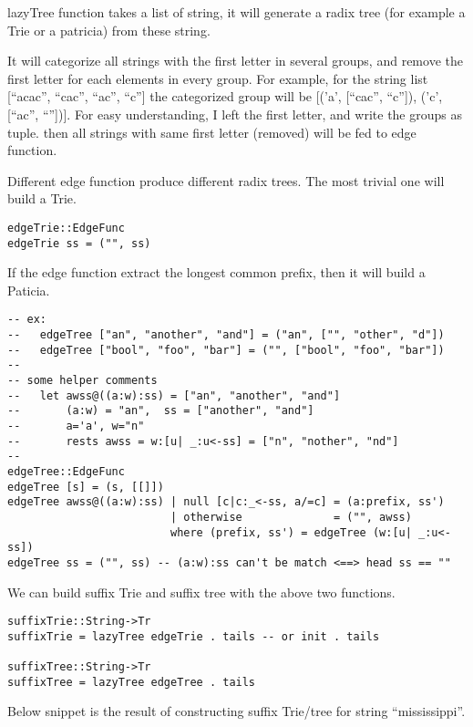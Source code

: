 \documentclass{article}
\begin{document}
lazyTree function takes a list of string, it will generate a radix
tree (for example a Trie or a patricia) from these string.

It will categorize all strings with the first letter in several groups, 
and remove the first letter for each elements in every group.
For example, for the string list [``acac'', ``cac'', ``ac'', ``c'']
the categorized group will be [('a', [``cac'', ``c'']), ('c', [``ac'', ``''])].
For easy understanding, I left the first letter, and write the groups
as tuple. then all strings with same first letter (removed) will
be fed to edge function.

Different edge function produce different radix trees. The most trivial
one will build a Trie.

\begin{lstlisting}
edgeTrie::EdgeFunc
edgeTrie ss = ("", ss)
\end{lstlisting}

If the edge function extract the longest common prefix, then it will 
build a Paticia.

\begin{lstlisting}
-- ex: 
--   edgeTree ["an", "another", "and"] = ("an", ["", "other", "d"])
--   edgeTree ["bool", "foo", "bar"] = ("", ["bool", "foo", "bar"])
--
-- some helper comments
--   let awss@((a:w):ss) = ["an", "another", "and"]
--       (a:w) = "an",  ss = ["another", "and"]
--       a='a', w="n"
--       rests awss = w:[u| _:u<-ss] = ["n", "nother", "nd"]
--
edgeTree::EdgeFunc
edgeTree [s] = (s, [[]])
edgeTree awss@((a:w):ss) | null [c|c:_<-ss, a/=c] = (a:prefix, ss')
                         | otherwise              = ("", awss)
                         where (prefix, ss') = edgeTree (w:[u| _:u<-ss])
edgeTree ss = ("", ss) -- (a:w):ss can't be match <==> head ss == ""
\end{lstlisting}

We can build suffix Trie and suffix tree with the above two functions.

\begin{lstlisting}
suffixTrie::String->Tr
suffixTrie = lazyTree edgeTrie . tails -- or init . tails

suffixTree::String->Tr
suffixTree = lazyTree edgeTree . tails
\end{lstlisting}

Below snippet is the result of constructing suffix Trie/tree for
string ``mississippi''.
\end{document}
